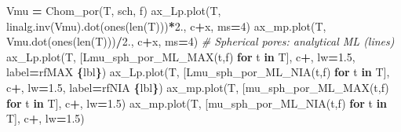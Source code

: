 \documentclass[
  a4paper,
  numbers=noendperiod,
  DIV=12]{scrreprt}
\newenvironment{Shaded}{\begin{snugshade}}{\end{snugshade}}
\newcommand{\BuiltInTok}[1]{#1}
\newcommand{\CommentTok}[1]{\textcolor[rgb]{0.56,0.35,0.01}{\textit{#1}}}
\newcommand{\ControlFlowTok}[1]{\textcolor[rgb]{0.13,0.29,0.53}{\textbf{#1}}}
\newcommand{\DecValTok}[1]{\textcolor[rgb]{0.00,0.00,0.81}{#1}}
\newcommand{\FloatTok}[1]{\textcolor[rgb]{0.00,0.00,0.81}{#1}}
\newcommand{\KeywordTok}[1]{\textcolor[rgb]{0.13,0.29,0.53}{\textbf{#1}}}
\newcommand{\NormalTok}[1]{#1}
\newcommand{\OperatorTok}[1]{\textcolor[rgb]{0.81,0.36,0.00}{\textbf{#1}}}
\newcommand{\SpecialCharTok}[1]{\textcolor[rgb]{0.81,0.36,0.00}{\textbf{#1}}}
\newcommand{\StringTok}[1]{\textcolor[rgb]{0.31,0.60,0.02}{#1}}
\newcommand{\VerbatimStringTok}[1]{\textcolor[rgb]{0.31,0.60,0.02}{#1}}
\begin{document}
\begin{Shaded}
\begin{Highlighting}[]
\NormalTok{        Vmu }\OperatorTok{=}\NormalTok{ Chom\_por(T, sch, f)}
\NormalTok{        ax\_Lp.plot(T, linalg.inv(Vmu).dot(ones(}\BuiltInTok{len}\NormalTok{(T)))}\OperatorTok{*}\FloatTok{2.}\NormalTok{, c}\OperatorTok{+}\StringTok{\textquotesingle{}x\textquotesingle{}}\NormalTok{, ms}\OperatorTok{=}\DecValTok{4}\NormalTok{)}
\NormalTok{        ax\_mp.plot(T, Vmu.dot(ones(}\BuiltInTok{len}\NormalTok{(T)))}\OperatorTok{/}\FloatTok{2.}\NormalTok{,             c}\OperatorTok{+}\StringTok{\textquotesingle{}x\textquotesingle{}}\NormalTok{, ms}\OperatorTok{=}\DecValTok{4}\NormalTok{)}
    \CommentTok{\# Spherical pores: analytical ML (lines)}
\NormalTok{    ax\_Lp.plot(T, [Lmu\_sph\_por\_ML\_MAX(t,f) }\ControlFlowTok{for}\NormalTok{ t }\KeywordTok{in}\NormalTok{ T], c}\OperatorTok{+}\StringTok{\textquotesingle{}{-}\textquotesingle{}}\NormalTok{,  lw}\OperatorTok{=}\FloatTok{1.5}\NormalTok{, label}\OperatorTok{=}\VerbatimStringTok{rf\textquotesingle{}MAX }\SpecialCharTok{\{}\NormalTok{lbl}\SpecialCharTok{\}}\VerbatimStringTok{\textquotesingle{}}\NormalTok{)}
\NormalTok{    ax\_Lp.plot(T, [Lmu\_sph\_por\_ML\_NIA(t,f) }\ControlFlowTok{for}\NormalTok{ t }\KeywordTok{in}\NormalTok{ T], c}\OperatorTok{+}\StringTok{\textquotesingle{}{-}{-}\textquotesingle{}}\NormalTok{, lw}\OperatorTok{=}\FloatTok{1.5}\NormalTok{, label}\OperatorTok{=}\VerbatimStringTok{rf\textquotesingle{}NIA }\SpecialCharTok{\{}\NormalTok{lbl}\SpecialCharTok{\}}\VerbatimStringTok{\textquotesingle{}}\NormalTok{)}
\NormalTok{    ax\_mp.plot(T, [mu\_sph\_por\_ML\_MAX(t,f)  }\ControlFlowTok{for}\NormalTok{ t }\KeywordTok{in}\NormalTok{ T], c}\OperatorTok{+}\StringTok{\textquotesingle{}{-}\textquotesingle{}}\NormalTok{,  lw}\OperatorTok{=}\FloatTok{1.5}\NormalTok{)}
\NormalTok{    ax\_mp.plot(T, [mu\_sph\_por\_ML\_NIA(t,f)  }\ControlFlowTok{for}\NormalTok{ t }\KeywordTok{in}\NormalTok{ T], c}\OperatorTok{+}\StringTok{\textquotesingle{}{-}{-}\textquotesingle{}}\NormalTok{, lw}\OperatorTok{=}\FloatTok{1.5}\NormalTok{)}


\end{Highlighting}
\end{Shaded}
\end{document}
